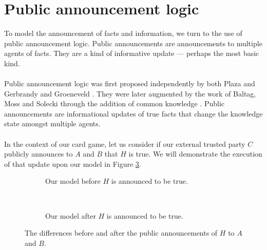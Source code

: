 \section{Public announcement logic}\label{pal}
To model the announcement of facts and information, we turn to the use of public
announcement logic.
Public announcements are announcements to multiple agents of facts.
They are a kind of informative update --- perhaps the most basic kind.\\
\\
Public announcement logic was first proposed independently by both Plaza and
Gerbrandy and Groeneveld \cite{plaza2007public,gelbrandy1997reasoning}.
They were later augmented by the work of Baltag, Moss and Solecki through the
addition of common knowledge \cite{baltag1998lpa}.
Public announcements are informational updates of true facts that change the
knowledge state amongst multiple agents.\\
\\
In the context of our card game, let us consider if our external trusted party
$C$ publicly announces to $A$ and $B$ that $H$ is true.
We will demonstrate the execution of that update upon our model in Figure
\ref{pakripkefigure}.
\begin{figure}[ht!]
\centering
\begin{subfigure}[b]{.45\textwidth}
\centering
{}
\caption{Our model before $H$ is announced to be true.}
\label{beforefigure}
\end{subfigure}
~
\begin{subfigure}[b]{.45\textwidth}
\centering
{}
\caption{Our model after $H$ is announced to be true.}
\label{afterfigure}
\end{subfigure}
\caption{The differences before and after the public announcements of $H$ to $A$ and
	$B$.}
\label{pakripkefigure}
\end{figure}
